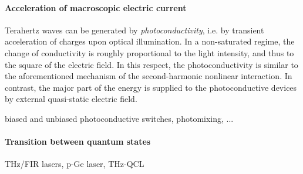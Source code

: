 \paragraph{Acceleration of macroscopic electric current}
Terahertz waves can be generated by \textit{photoconductivity}, i.e. by transient acceleration of charges upon optical illumination.
In a non-saturated regime, the change of conductivity is roughly proportional to the light intensity, and thus to the square of the electric field. In this respect, the photoconductivity is similar to the aforementioned mechanism of the second-harmonic nonlinear interaction. In contrast, the major part of the energy is supplied to the photoconductive devices by external quasi-static electric field.



 biased and unbiased photoconductive switches, photomixing, ...

\paragraph{Transition between quantum states}
 THz/FIR lasers, p-Ge laser, THz-QCL

